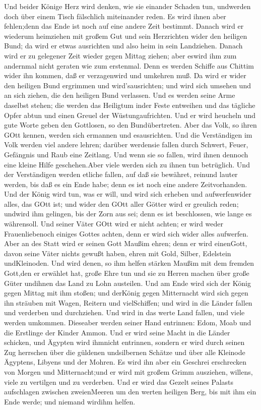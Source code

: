 Und beider Könige Herz wird denken, wie sie einander Schaden tun,
undwerden doch über einem Tisch fälschlich miteinander reden. Es wird
ihnen aber fehlen;denn das Ende ist noch auf eine andere Zeit bestimmt.
 Danach wird er wiederum heimziehen mit großem Gut und sein
Herzrichten wider den heiligen Bund; da wird er etwas ausrichten und
also heim in sein Landziehen.  Danach wird er zu gelegener
Zeit wieder gegen Mittag ziehen; aber eswird ihm zum andernmal nicht
geraten wie zum erstenmal.  Denn es werden Schiffe aus
Chittim wider ihn kommen, daß er verzagenwird und umkehren muß. Da wird
er wider den heiligen Bund ergrimmen und wird'sausrichten; und wird sich
umsehen und an sich ziehen, die den heiligen Bund verlassen.
 Und es werden seine Arme daselbst stehen; die werden das
Heiligtum inder Feste entweihen und das tägliche Opfer abtun und einen
Greuel der Wüstungaufrichten.  Und er wird heucheln und
gute Worte geben den Gottlosen, so den Bundübertreten. Aber das Volk, so
ihren GOtt kennen, werden sich ermannen und esausrichten. 
Und die Verständigen im Volk werden viel andere lehren; darüber
werdensie fallen durch Schwert, Feuer, Gefängnis und Raub eine Zeitlang.
 Und wenn sie so fallen, wird ihnen dennoch eine kleine
Hilfe geschehen.Aber viele werden sich zu ihnen tun betrüglich.
 Und der Verständigen werden etliche fallen, auf daß sie
bewähret, reinund lauter werden, bis daß es ein Ende habe; denn es ist
noch eine andere Zeitvorhanden.  Und der König wird tun,
was er will, und wird sich erheben und aufwerfenwider alles, das GOtt
ist; und wider den GOtt aller Götter wird er greulich reden; undwird ihm
gelingen, bis der Zorn aus sei; denn es ist beschlossen, wie lange es
währensoll.  Und seiner Väter GOtt wird er nicht achten; er
wird weder Frauenliebenoch einiges Gottes achten, denn er wird sich
wider alles aufwerfen.  Aber an des Statt wird er seinen
Gott Maußim ehren; denn er wird einenGott, davon seine Väter nichts
gewußt haben, ehren mit Gold, Silber, Edelstein undKleinoden.
 Und wird denen, so ihm helfen stärken Maußim mit dem
fremden Gott,den er erwählet hat, große Ehre tun und sie zu Herren
machen über große Güter undihnen das Land zu Lohn austeilen.
 Und am Ende wird sich der König gegen Mittag mit ihm
stoßen; und derKönig gegen Mitternacht wird sich gegen ihn sträuben mit
Wagen, Reitern und vielSchiffen; und wird in die Länder fallen und
verderben und durchziehen.  Und wird in das werte Land
fallen, und viele werden umkommen. Dieseaber werden seiner Hand
entrinnen: Edom, Moab und die Erstlinge der Kinder Ammon. 
Und er wird seine Macht in die Länder schicken, und Ägypten wird
ihmnicht entrinnen,  sondern er wird durch seinen Zug
herrschen über die güldenen undsilbernen Schätze und über alle Kleinode
Ägyptens, Libyens und der Mohren.  Es wird ihn aber ein
Geschrei erschrecken von Morgen und Mitternacht;und er wird mit großem
Grimm ausziehen, willens, viele zu vertilgen und zu verderben.
 Und er wird das Gezelt seines Palasts aufschlagen zwischen
zweienMeeren um den werten heiligen Berg, bis mit ihm ein Ende werde;
und niemand wirdihm helfen.

